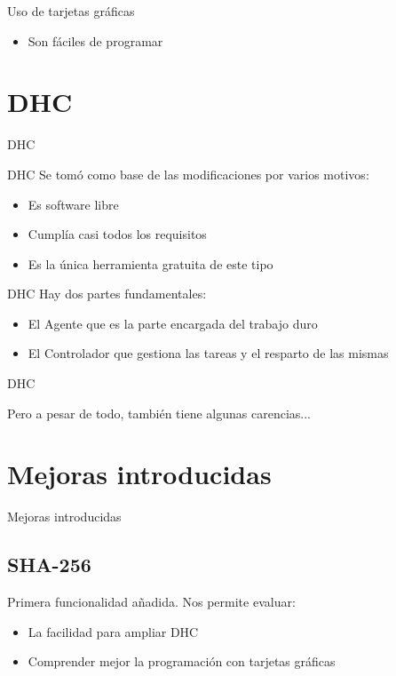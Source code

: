 \documentclass[12pt]{beamer}
\newcommand{\mysection}[1]{\begin{frame}{}\begin{center}\Huge #1\end{center}\end{frame}}
\begin{document}
\begin{frame}{Uso de tarjetas gráficas}
\begin{itemize}
		\item Son fáciles de programar
			\only<4>{
				\testcode
			}
	\end{itemize}
\end{frame}

\section{DHC}
\mysection{DHC}
\begin{frame}{DHC}
	Se tomó como base de las modificaciones por varios motivos:
	\pause
	\begin{itemize}
		\item Es software libre
		\item Cumplía casi todos los requisitos
		\item Es la única herramienta gratuita de este tipo
	\end{itemize}
\end{frame}

\begin{frame}{DHC}
	Hay dos partes fundamentales:
	\pause
	\begin{itemize}
		\item El \color{green}Agente \color{white}que es la parte encargada del trabajo duro
		\item El \color{green}Controlador \color{white}que gestiona las tareas y el resparto de las mismas
	\end{itemize}
\end{frame}
\begin{frame}{DHC}
	\begin{center}
		Pero a pesar de todo, también tiene algunas carencias...
	\end{center}
\end{frame}


\section{Mejoras introducidas}

\mysection{Mejoras introducidas}

\subsection{SHA-256}
\begin{frame}
	Primera funcionalidad añadida. Nos permite evaluar:
	\pause
	\begin{itemize}
		\item La facilidad para ampliar DHC
		\item Comprender mejor la programación con tarjetas gráficas
	\end{itemize}
\end{frame}
\end{document}
